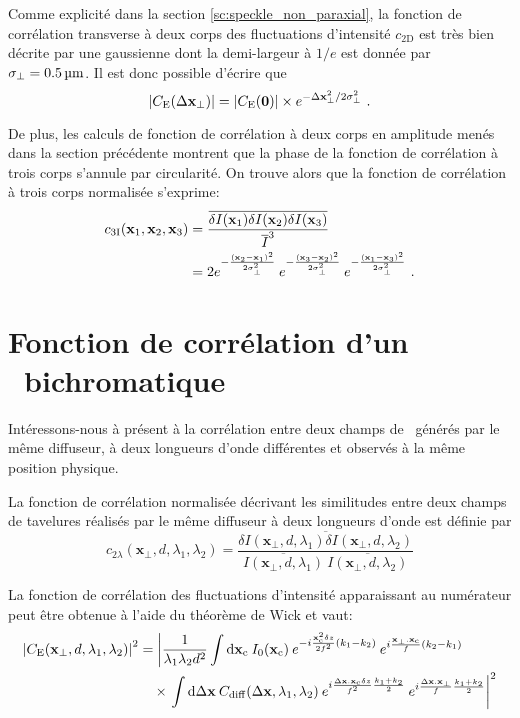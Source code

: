 Comme explicité dans la section \ref{sc:speckle_non_paraxial}, la fonction de corrélation transverse à deux corps des fluctuations d'intensité $c_{\mathrm{2D}}$ est très bien décrite par une gaussienne dont la demi-largeur à $1/e$ est donnée par $\sigma_{\perp}=\SI{0.5}{\micro\metre}$. Il est donc possible d'écrire que
\begin{equation}
\left|C_{\mathrm{E}}(\Delta\mathbf{x}_{\perp})\right|=|C_{\mathrm{E}}(\mathbf{0})| \times e^{-\Delta\mathbf{x}_{\perp}^2/2\sigma_{\perp}^2} \text{ .}
\end{equation}

De plus, les calculs de fonction de corrélation à deux corps en amplitude menés dans la section précédente montrent que la phase de la fonction de corrélation à trois corps s'annule par circularité. On trouve alors que la fonction de corrélation à trois corps normalisée s'exprime:
\begin{align}
c_{\mathrm{3I}}(\mathbf{x}_1,\mathbf{x}_2,\mathbf{x}_3) &= \frac{\overline{\delta I(\mathbf{x}_1) \delta I(\mathbf{x}_2) \delta I(\mathbf{x}_3)}}{\overline{I}^3}\\
&= 2 e^{-\frac{(\mathbf{x}_2-\mathbf{x}_1)^2}{2\sigma_{\perp}^2}} \: e^{-\frac{(\mathbf{x}_3-\mathbf{x}_2)^2}{2\sigma_{\perp}^2}} \: e^{-\frac{(\mathbf{x}_1-\mathbf{x}_3)^2}{2\sigma_{\perp}^2}} \text{ .}
\end{align}

\section{Fonction de corrélation d'un \speckle\ bichromatique}
Intéressons-nous à présent à la corrélation entre deux champs de \speckle\ générés par le même diffuseur, à deux longueurs d'onde différentes et observés à la même position physique.


La fonction de corrélation normalisée décrivant les similitudes entre deux champs de tavelures réalisés par le même diffuseur à deux longueurs d'onde est définie par
\begin{equation}
c_{2\lambda}(\mathbf{x}_{\perp},d,\lambda_1, \lambda_2)=\frac{\overline{\delta I (\mathbf{x}_{\perp},d,\lambda_1) \delta I (\mathbf{x}_{\perp},d,\lambda_2)}}{\overline{I(\mathbf{x}_{\perp},d,\lambda_1)}\:\overline{I(\mathbf{x}_{\perp},d,\lambda_2)}}
\end{equation}

La fonction de corrélation des fluctuations d'intensité apparaissant au numérateur peut être obtenue à l'aide du théorème de Wick et vaut:
\begin{align}
\left| C_{\mathrm{E}}(\mathbf{x}_{\perp},d,\lambda_1,\lambda_2) \right|^2 &= \left| \frac{1}{\lambda_1\lambda_2 d^2} \int{\mathop{}\mathopen{}\mathrm{d}\mathbf{x}_{\mathrm{c}}\: I_0(\mathbf{x}_{\mathrm{c}}) \: e^{-i\frac{\mathbf{x}_{\mathrm{c}}^2 \delta z}{2f^2}(k_1-k_2)} \: e^{i \frac{\mathbf{x}_{\perp}.\mathbf{x}_{\mathrm{c}}}{f}(k_2-k_1)}}\right. \\
&\nonumber \quad\times \left. \int{\mathop{}\mathopen{}\mathrm{d}\Delta\mathbf{x}\: C_{\mathrm{diff}}(\Delta\mathbf{x}, \lambda_1, \lambda_2)\: e^{i \frac{\Delta\mathbf{x}.\mathbf{x}_{\mathrm{c}}\delta z}{f^2}\frac{k_1+k_2}{2}} \: e^{i\frac{\Delta\mathbf{x}.\mathbf{x}_{\perp}}{f}\frac{k_1+k_2}{2}}}\right|^2
\end{align}

